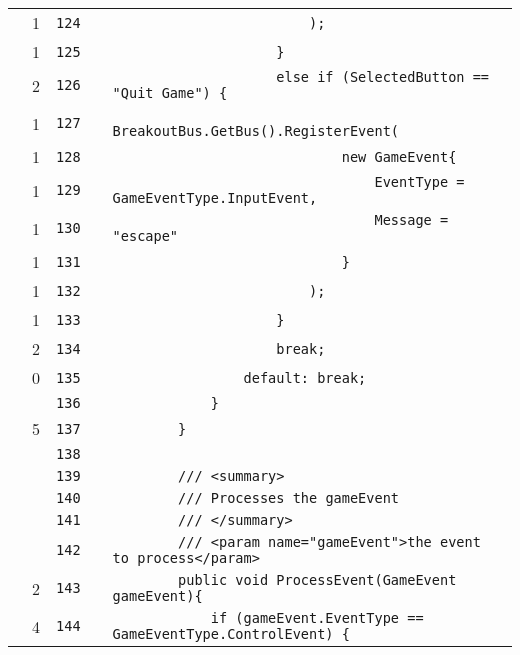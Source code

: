 \documentclass[a4paper,landscape,10pt]{article}
\begin{document}
\begin{longtable}[l]{lrrll}
\cellcolor{green} & 1 & \verb~124~ & & \verb~                        );~\\
\cellcolor{green} & 1 & \verb~125~ & & \verb~                    }~\\
\cellcolor{green} & 2 & \verb~126~ & & \verb~                    else if (SelectedButton == "Quit Game") {~\\
\cellcolor{green} & 1 & \verb~127~ & & \verb~                        BreakoutBus.GetBus().RegisterEvent(~\\
\cellcolor{green} & 1 & \verb~128~ & & \verb~                            new GameEvent{~\\
\cellcolor{green} & 1 & \verb~129~ & & \verb~                                EventType = GameEventType.InputEvent,~\\
\cellcolor{green} & 1 & \verb~130~ & & \verb~                                Message = "escape"~\\
\cellcolor{green} & 1 & \verb~131~ & & \verb~                            }~\\
\cellcolor{green} & 1 & \verb~132~ & & \verb~                        );~\\
\cellcolor{green} & 1 & \verb~133~ & & \verb~                    }~\\
\cellcolor{green} & 2 & \verb~134~ & & \verb~                    break;~\\
\cellcolor{red} & 0 & \verb~135~ & & \verb~                default: break;~\\
\cellcolor{gray} &  & \verb~136~ & & \verb~            }~\\
\cellcolor{green} & 5 & \verb~137~ & & \verb~        }~\\
\cellcolor{gray} &  & \verb~138~ & & \verb~~\\
\cellcolor{gray} &  & \verb~139~ & & \verb~        /// <summary>~\\
\cellcolor{gray} &  & \verb~140~ & & \verb~        /// Processes the gameEvent~\\
\cellcolor{gray} &  & \verb~141~ & & \verb~        /// </summary>~\\
\cellcolor{gray} &  & \verb~142~ & & \verb~        /// <param name="gameEvent">the event to process</param>~\\
\cellcolor{green} & 2 & \verb~143~ & & \verb~        public void ProcessEvent(GameEvent gameEvent){~\\
\cellcolor{green} & 4 & \verb~144~ & & \verb~            if (gameEvent.EventType == GameEventType.ControlEvent) {~\\

\end{longtable}
\end{document}
